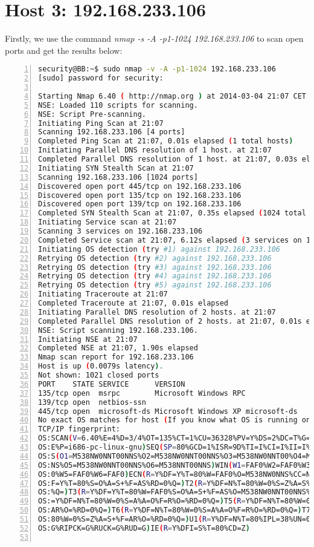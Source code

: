 \section*{Host 3: 192.168.233.106}
\par Firstly, we use the command \textit{nmap -s -A -p1-1024 192.168.233.106}  to scan open ports and get the results below:
\par \begin{lstlisting}[language=sh,numbers=left,numberstyle=\tiny,columns=fullflexible,basicstyle=\footnotesize\ttfamily, breaklines=true, breakautoindent=true, breakindent=4em]
security@BB:~$ sudo nmap -v -A -p1-1024 192.168.233.106
[sudo] password for security: 

Starting Nmap 6.40 ( http://nmap.org ) at 2014-03-04 21:07 CET
NSE: Loaded 110 scripts for scanning.
NSE: Script Pre-scanning.
Initiating Ping Scan at 21:07
Scanning 192.168.233.106 [4 ports]
Completed Ping Scan at 21:07, 0.01s elapsed (1 total hosts)
Initiating Parallel DNS resolution of 1 host. at 21:07
Completed Parallel DNS resolution of 1 host. at 21:07, 0.03s elapsed
Initiating SYN Stealth Scan at 21:07
Scanning 192.168.233.106 [1024 ports]
Discovered open port 445/tcp on 192.168.233.106
Discovered open port 135/tcp on 192.168.233.106
Discovered open port 139/tcp on 192.168.233.106
Completed SYN Stealth Scan at 21:07, 0.35s elapsed (1024 total ports)
Initiating Service scan at 21:07
Scanning 3 services on 192.168.233.106
Completed Service scan at 21:07, 6.12s elapsed (3 services on 1 host)
Initiating OS detection (try #1) against 192.168.233.106
Retrying OS detection (try #2) against 192.168.233.106
Retrying OS detection (try #3) against 192.168.233.106
Retrying OS detection (try #4) against 192.168.233.106
Retrying OS detection (try #5) against 192.168.233.106
Initiating Traceroute at 21:07
Completed Traceroute at 21:07, 0.01s elapsed
Initiating Parallel DNS resolution of 2 hosts. at 21:07
Completed Parallel DNS resolution of 2 hosts. at 21:07, 0.01s elapsed
NSE: Script scanning 192.168.233.106.
Initiating NSE at 21:07
Completed NSE at 21:07, 1.90s elapsed
Nmap scan report for 192.168.233.106
Host is up (0.0079s latency).
Not shown: 1021 closed ports
PORT    STATE SERVICE      VERSION
135/tcp open  msrpc        Microsoft Windows RPC
139/tcp open  netbios-ssn
445/tcp open  microsoft-ds Microsoft Windows XP microsoft-ds
No exact OS matches for host (If you know what OS is running on it, see http://nmap.org/submit/ ).
TCP/IP fingerprint:
OS:SCAN(V=6.40%E=4%D=3/4%OT=135%CT=1%CU=36328%PV=Y%DS=2%DC=T%G=Y%TM=5316329
OS:E%P=i686-pc-linux-gnu)SEQ(SP=80%GCD=1%ISR=9D%TI=I%CI=I%II=I%SS=S%TS=0)OP
OS:S(O1=M538NW0NNT00NNS%O2=M538NW0NNT00NNS%O3=M538NW0NNT00%O4=M538NW0NNT00N
OS:NS%O5=M538NW0NNT00NNS%O6=M538NNT00NNS)WIN(W1=FAF0%W2=FAF0%W3=FAF0%W4=FAF
OS:0%W5=FAF0%W6=FAF0)ECN(R=Y%DF=Y%T=80%W=FAF0%O=M538NW0NNS%CC=N%Q=)T1(R=Y%D
OS:F=Y%T=80%S=O%A=S+%F=AS%RD=0%Q=)T2(R=Y%DF=N%T=80%W=0%S=Z%A=S%F=AR%O=%RD=0
OS:%Q=)T3(R=Y%DF=Y%T=80%W=FAF0%S=O%A=S+%F=AS%O=M538NW0NNT00NNS%RD=0%Q=)T4(R
OS:=Y%DF=N%T=80%W=0%S=A%A=O%F=R%O=%RD=0%Q=)T5(R=Y%DF=N%T=80%W=0%S=Z%A=S+%F=
OS:AR%O=%RD=0%Q=)T6(R=Y%DF=N%T=80%W=0%S=A%A=O%F=R%O=%RD=0%Q=)T7(R=Y%DF=N%T=
OS:80%W=0%S=Z%A=S+%F=AR%O=%RD=0%Q=)U1(R=Y%DF=N%T=80%IPL=38%UN=0%RIPL=G%RID=
OS:G%RIPCK=G%RUCK=G%RUD=G)IE(R=Y%DFI=S%T=80%CD=Z)


\end{lstlisting}
